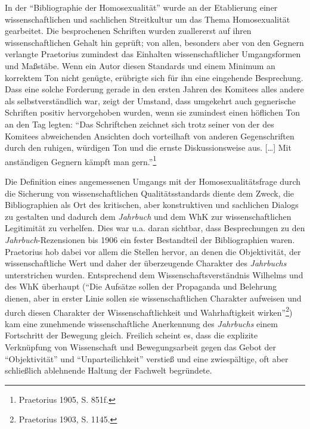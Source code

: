 \documentclass[a4paper,
fontsize=11pt,
oneside,
numbers=noperiodatend,
parskip=half-,
bibliography=totoc,
final
]{scrartcl}
\begin{document}
In der \enquote{Bibliographie der Homosexualität} wurde an der
Etablierung einer wissenschaftlichen und sachlichen Streitkultur um das
Thema Homosexualität gearbeitet. Die besprochenen Schriften wurden
zuallererst auf ihren wissenschaftlichen Gehalt hin geprüft; von allen,
besonders aber von den Gegnern verlangte Praetorius zumindest das
Einhalten wissenschaftlicher Umgangsformen und Maßstäbe. Wenn ein Autor
diesen Standards und einem Minimum an korrektem Ton nicht genügte,
erübrigte sich für ihn eine eingehende Besprechung. Dass eine solche
Forderung gerade in den ersten Jahren des Komitees alles andere als
selbstverständlich war, zeigt der Umstand, dass umgekehrt auch
gegnerische Schriften positiv hervorgehoben wurden, wenn sie zumindest
einen höflichen Ton an den Tag legten: \enquote{Das Schriftchen zeichnet
sich trotz seiner von der des Komitees abweichenden Ansichten doch
vorteilhaft von anderen Gegenschriften durch den ruhigen, würdigen Ton
und die ernste Diskussionsweise aus. {[}\ldots{}{]} Mit anständigen
Gegnern kämpft man gern.}\footnote{Praetorius 1905, S. 851f.}

Die Definition eines angemessenen Umgangs mit der Homosexualitätsfrage
durch die Sicherung von wissenschaftlichen Qualitätsstandards diente dem
Zweck, die Bibliographien als Ort des kritischen, aber konstruktiven und
sachlichen Dialogs zu gestalten und dadurch dem \emph{Jahrbuch} und dem
WhK zur wissenschaftlichen Legitimität zu verhelfen. Dies war u.a. daran
sichtbar, dass Besprechungen zu den \emph{Jahrbuch}-Rezensionen bis 1906
ein fester Bestandteil der Bibliographien waren. Praetorius hob dabei
vor allem die Stellen hervor, an denen die Objektivität, der
wissenschaftliche Wert und daher der überzeugende Charakter des
\emph{Jahrbuchs} unterstrichen wurden. Entsprechend dem
Wissenschaftsverständnis Wilhelms und des WhK überhaupt (\enquote{Die
Aufsätze sollen der Propaganda und Belehrung dienen, aber in erster
Linie sollen sie wissenschaftlichen Charakter aufweisen und durch diesen
Charakter der Wissenschaftlichkeit und Wahrhaftigkeit wirken}\footnote{Praetorius
  1903, S. 1145.}) kam eine zunehmende wissenschaftliche Anerkennung des
\emph{Jahrbuchs} einem Fortschritt der Bewegung gleich. Freilich scheint
es, dass die explizite Verknüpfung von Wissenschaft und Bewegungsarbeit
gegen das Gebot der \enquote{Objektivität} und
\enquote{Unparteilichkeit} verstieß und eine zwiespältige, oft aber
schließlich ablehnende Haltung der Fachwelt begründete.
\end{document}
